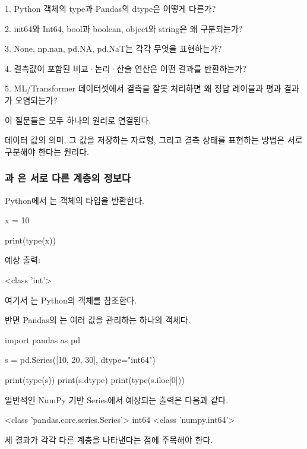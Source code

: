 \begin{dhksmry}
1. Python 객체의 type과 Pandas의 dtype은 어떻게 다른가?

2. int64와 Int64, bool과 boolean, object와 string은 왜 구분되는가?

3. None, np.nan, pd.NA, pd.NaT는 각각 무엇을 표현하는가?

4. 결측값이 포함된 비교·논리·산술 연산은 어떤 결과를 반환하는가?

5. ML/Transformer 데이터셋에서 결측을 잘못 처리하면 왜 정답 레이블과
   평과 결과가 오염되는가?
\end{dhksmry}

이 질문들은 모두 하나의 원리로 연결된다.

데이터 값의 의미, 그 값을 저장하는 자료형, 그리고 결측 상태를 표현하는 방법은 서로 구분해야 한다는 원리다.

\subsubsection{과 은 서로 다른 계층의 정보다}

Python에서 는 객체의 타입을 반환한다.

\begin{dhkcode}
x = 10

print(type(x))
\end{dhkcode}

예상 출력:

\begin{dhkzsh}
<class 'int'>
\end{dhkzsh}

여기서 는 Python의  객체를 참조한다.

반면 Pandas의 는 여러 값을 관리하는 하나의 객체다.

\begin{dhkcode}
import pandas as pd

s = pd.Series([10, 20, 30], dtype="int64")

print(type(s))
print(s.dtype)
print(type(s.iloc[0]))
\end{dhkcode}

일반적인 NumPy 기반  Series에서 예상되는 출력은 다음과 같다.

\begin{dhkzsh}
<class 'pandas.core.series.Series'>
int64
<class 'numpy.int64'>
\end{dhkzsh}

세 결과가 각각 다른 계층을 나타낸다는 점에 주목해야 한다.


